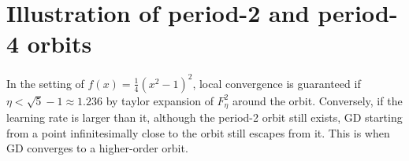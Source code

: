 \documentclass{article}
\theoremstyle{plain}
\theoremstyle{remark}
\newcommand{\norm}[1]{\left\lVert#1\right\rVert}
\begin{document}


\section{Illustration of period-2 and period-4 orbits}
\label{app:add_figs}


In the setting of $f(x)=\frac{1}{4}(x^2-1)^2$, local convergence is guaranteed if $\eta<\sqrt{5}-1\approx 1.236$ by taylor expansion of $F^2_\eta$ around the orbit. Conversely, if the learning rate is larger than it, although the period-2 orbit still exists, GD starting from a point infinitesimally close to the orbit still escapes from it. This is when GD converges to a higher-order orbit.
\end{document}
